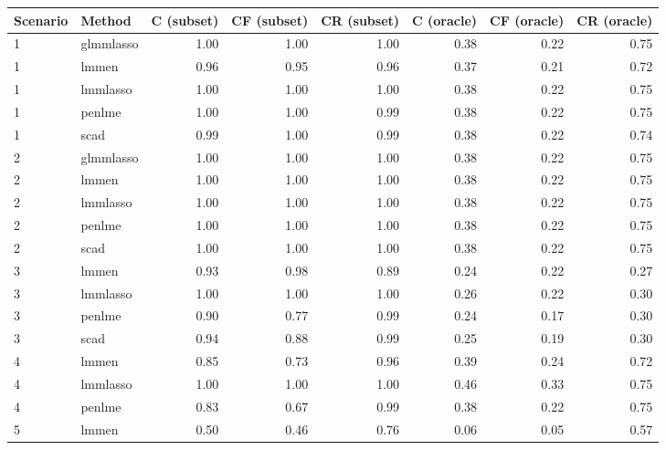 \documentclass[varwidth, border={10 5 400 5}]{standalone}
\begin{document}
\begin{table}[ht]
\centering
\begin{tabular}{llrrrrrr}
  \hline
Scenario & Method & C (subset) & CF (subset) & CR (subset) & C (oracle) & CF (oracle) & CR (oracle) \\ 
  \hline
1 & glmmlasso & 1.00 & 1.00 & 1.00 & 0.38 & 0.22 & 0.75 \\ 
  1 & lmmen & 0.96 & 0.95 & 0.96 & 0.37 & 0.21 & 0.72 \\ 
  1 & lmmlasso & 1.00 & 1.00 & 1.00 & 0.38 & 0.22 & 0.75 \\ 
  1 & penlme & 1.00 & 1.00 & 0.99 & 0.38 & 0.22 & 0.75 \\ 
  1 & scad & 0.99 & 1.00 & 0.99 & 0.38 & 0.22 & 0.74 \\ 
  2 & glmmlasso & 1.00 & 1.00 & 1.00 & 0.38 & 0.22 & 0.75 \\ 
  2 & lmmen & 1.00 & 1.00 & 1.00 & 0.38 & 0.22 & 0.75 \\ 
  2 & lmmlasso & 1.00 & 1.00 & 1.00 & 0.38 & 0.22 & 0.75 \\ 
  2 & penlme & 1.00 & 1.00 & 1.00 & 0.38 & 0.22 & 0.75 \\ 
  2 & scad & 1.00 & 1.00 & 1.00 & 0.38 & 0.22 & 0.75 \\ 
  3 & lmmen & 0.93 & 0.98 & 0.89 & 0.24 & 0.22 & 0.27 \\ 
  3 & lmmlasso & 1.00 & 1.00 & 1.00 & 0.26 & 0.22 & 0.30 \\ 
  3 & penlme & 0.90 & 0.77 & 0.99 & 0.24 & 0.17 & 0.30 \\ 
  3 & scad & 0.94 & 0.88 & 0.99 & 0.25 & 0.19 & 0.30 \\ 
  4 & lmmen & 0.85 & 0.73 & 0.96 & 0.39 & 0.24 & 0.72 \\ 
  4 & lmmlasso & 1.00 & 1.00 & 1.00 & 0.46 & 0.33 & 0.75 \\ 
  4 & penlme & 0.83 & 0.67 & 0.99 & 0.38 & 0.22 & 0.75 \\ 
  5 & lmmen & 0.50 & 0.46 & 0.76 & 0.06 & 0.05 & 0.57 \\ 
   \hline
\end{tabular}
\end{table}
\end{document}
